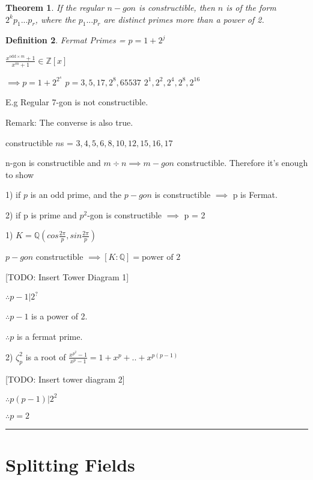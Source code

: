 \documentclass[twoside]{article}
\newcounter{lecnum}
\newcommand{\Z}{\mathbb{Z}}
\newcommand{\Q}{\mathbb{Q}}
\newtheorem{theorem}{Theorem}[lecnum]
\newtheorem{definition}[theorem]{Definition}
\newenvironment{proof}{{\bf Proof:}}{\hfill\rule{2mm}{2mm}}
\begin{document}
    \begin{theorem}
        If the regular $n-gon$ is constructible, then $n$ is of the form $2^kp_1...p_r$, where the $p_1...p_r$ are distinct primes more than a power of 2.
    \end{theorem}

    \begin{definition}
        Fermat Primes = $p = 1 + 2^j$

        $\frac{x^{\text{odd}\times m} + 1}{x^m + 1} \in \Z[x]$
        
        $\implies p = 1 + 2^{2^s}$
        $p = 3,5,17,2^8, 65537$
        $2^1, 2^2, 2^4, 2^8, 2^{16}$
    \end{definition}

    E.g Regular 7-gon is not constructible.

    Remark: The converse is also true. 

    constructible $n$s = $3,4,5,6,8,10,12,15,16,17$

    \begin{proof}
        n-gon is constructible and  $m \div n \implies m-gon$ constructible. Therefore it's enough to show 

        1) if $p$ is an odd prime, and the $p-gon$ is constructible $\implies$ p is Fermat.

        2) if p is prime and $p^2$-gon is constructible $\implies$ p = 2

        1) $K = \Q (cos \frac{2\pi}{p}, sin \frac{2\pi}{p})$

        $p-gon$ constructible $\implies [K : \Q] = \text{power of 2}$

        [TODO: Insert Tower Diagram 1]

        $\therefore p-1 \vert 2^{?}$

        $\therefore p-1 $ is a power of 2. 

        $\therefore p$ is a fermat prime.

        2) $\zeta_p^2 $ is a root of $\frac{x^{p^2} - 1}{x^p - 1} = 1 + x^p + .. + x^{p(p-1)}$

        [TODO: Insert tower diagram 2]

        $\therefore p(p-1) \vert 2^2$

        $\therefore p = 2$
    \end{proof}

    \section{Splitting Fields}
\end{document}
